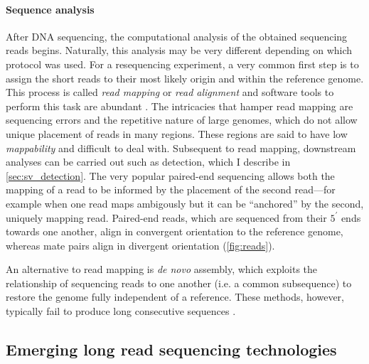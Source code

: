 \paragraph{Sequence analysis}
After DNA sequencing, the computational analysis of the obtained sequencing
reads begins. Naturally, this analysis may be very different depending on which
protocol was used. For a \wgs resequencing experiment, a very common first step
is to assign the short reads to their most likely origin and
 within the reference
genome. This process is called \emph{read mapping} or \emph{read alignment} and
software tools to perform this task are abundant
\citep{Li2009,Weese2009,Langmead2009,Alkan2009,Li2013}. The intricacies that
hamper read mapping are sequencing errors and the repetitive nature of large
genomes, which do not allow unique placement of reads in many regions. These
regions are said to have low \emph{mappability} and difficult to deal with.
Subsequent to read mapping, downstream analyses can be carried out such as \sv
detection, which I describe in \cref{sec:sv_detection}. The very popular
paired-end sequencing allows both the mapping of a read to be
informed by the placement of the second read---for example when one read maps
ambigously but it can be ``anchored'' by the second, uniquely mapping read.
Paired-end reads, which are sequenced from their $5^\prime$ ends towards one
another, align in convergent orientation to the reference genome, whereas mate
pairs align in divergent orientation (\cref{fig:reads}).

An alternative to read mapping is \emph{de novo} assembly, which exploits the
relationship of sequencing reads to one another (i.e. a common subsequence) to
restore the genome fully independent of a reference. These methods, however,
typically fail to produce long consecutive sequences \citep{Alkan2011_assembly}.










\subsection{Emerging long read sequencing technologies}
\label{sec:long_read_seq}

